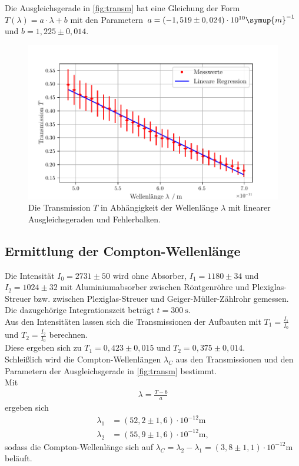 \noindent Die Ausgleichsgerade in \autoref{fig:transm} hat eine Gleichung der Form $T(\lambda) = a \cdot \lambda + b$ mit 
den Parametern $a = (-1,519 \pm 0,024)\cdot 10^{10}\symup{m}^{-1}$ und $b = 1,225 \pm 0,014$.

\begin{figure}[H]
  \centering
  \includegraphics{build/transmission2.pdf}
  \caption{Die Transmission $T$ in Abhängigkeit der Wellenlänge $\lambda$ mit linearer Ausgleichsgeraden und Fehlerbalken.}
  \label{fig:transm2}
\end{figure}



\subsection{Ermittlung der Compton-Wellenlänge}
\label{subsec:comptonwellenl}

Die Intensität $I_0 = 2731 \pm 50$ wird ohne Absorber, $I_1 = 1180 \pm 34$ und $I_2 = 1024 \pm 32$ mit Aluminiumabsorber zwischen Röntgenröhre
und Plexiglas-Streuer bzw. zwischen Plexiglas-Streuer und Geiger-Müller-Zählrohr gemessen.\\
Die dazugehörige Integrationszeit beträgt $t = \SI{300}{\second}$.\\

\noindent Aus den Intensitäten lassen sich die Transmissionen der Aufbauten mit $T_1 = \frac{I_1}{I_0}$ und $T_2 = \frac{I_2}{I_0}$ berechnen. \\
Diese ergeben sich zu $T_1 = 0,423 \pm 0,015$ und $T_2 = 0,375 \pm 0,014$.\\

\noindent Schleißlich wird die Compton-Wellenlängen $\lambda_C$ aus den Transmissionen und den Parametern der Ausgleichsgerade 
in \autoref{fig:transm} bestimmt. \\
Mit 
\begin{align*}
  \lambda = \frac{T-b}{a}
\end{align*}
ergeben sich
\begin{align*}
  \lambda_1 &= (52,2 \pm 1,6) \cdot 10^{-12}\unit{\meter} \\
  \lambda_2 &= (55,9 \pm 1,6) \cdot 10^{-12}\unit{\meter},
\end{align*}
sodass die Compton-Wellenlänge sich auf $\lambda_C = \lambda_2 - \lambda_1 = (3,8 \pm 1,1) \cdot 10^{-12}\unit{\meter}$ beläuft.\\
